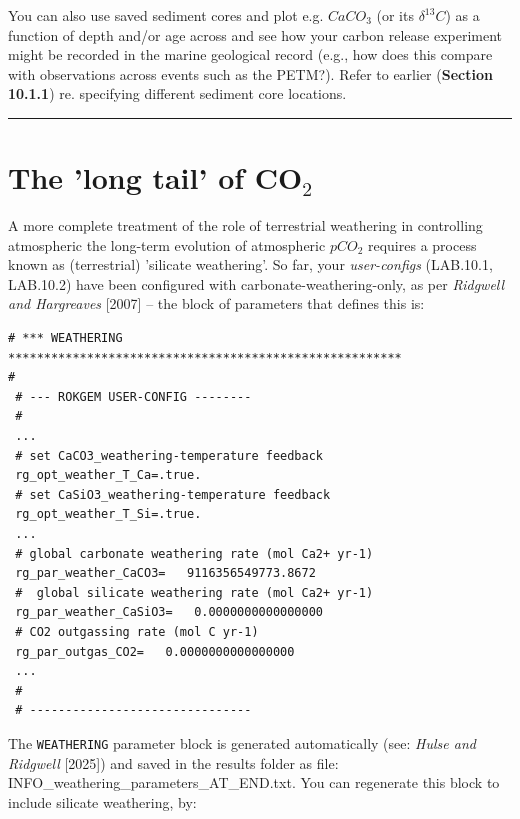 You can also use saved sediment cores and plot e.g. \(CaCO_{3}\) (or its \(\delta^{13}C\)) as a function of depth and/or age across and see how your carbon release experiment might be recorded in the marine geological record (e.g., how does this compare with observations across events such as the PETM?). Refer to earlier (\textbf{Section 10.1.1}) re. specifying different sediment core locations.

\vspace{1mm}\noindent\rule{4cm}{0.1mm}\vspace{2mm}

\newpage

\section{The 'long tail' of CO$_{2}$}

\noindent A more complete treatment of the role of terrestrial weathering in controlling atmospheric the long-term evolution of atmospheric \(pCO_{2}\) requires a process known as (terrestrial) 'silicate weathering'. So far, your \textit{user-configs} (\textsf{\footnotesize LAB.10.1}, \textsf{\footnotesize LAB.10.2}) have been configured with carbonate-weathering-only, as per \textit{Ridgwell and Hargreaves} [2007] -- the block of parameters that defines this is:

\vspace{-1mm}\footnotesize\begin{verbatim}
# *** WEATHERING *******************************************************
#
 # --- ROKGEM USER-CONFIG --------
 #
 ...    
 # set CaCO3_weathering-temperature feedback
 rg_opt_weather_T_Ca=.true.
 # set CaSiO3_weathering-temperature feedback
 rg_opt_weather_T_Si=.true.
 ...
 # global carbonate weathering rate (mol Ca2+ yr-1)
 rg_par_weather_CaCO3=   9116356549773.8672     
 #  global silicate weathering rate (mol Ca2+ yr-1)
 rg_par_weather_CaSiO3=   0.0000000000000000     
 # CO2 outgassing rate (mol C yr-1)
 rg_par_outgas_CO2=   0.0000000000000000     
 ...
 #
 # -------------------------------
\end{verbatim}\normalsize\vspace{-1mm}
The \texttt{\footnotesize WEATHERING} parameter block is generated automatically (see: \textit{Hulse and Ridgwell} [2025]) and saved in the \textsf{\footnotesize results} folder as file: \textsf{\footnotesize INFO\_weathering\_parameters\_AT\_END.txt}. You can regenerate this block to include silicate weathering, by:

